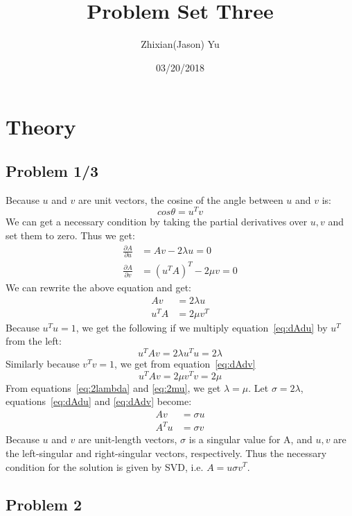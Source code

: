 \documentclass{article}
\title{Problem Set Three}
\date{03/20/2018}
\author{Zhixian(Jason) Yu}
\begin{document}
\maketitle
{}
\newpage

\section{Theory}
\subsection*{Problem 1/3}
Because $u$ and $v$ are unit vectors, the cosine of the angle between $u$ and $v$ is:
\begin{equation}
cos\theta = u^T v
\end{equation}
We can get a necessary condition by taking the partial derivatives over $u, v$ and set them to zero. Thus we get:
\begin{align}
\frac{\partial A}{\partial u} &= Av - 2\lambda u = 0 \\
\frac{\partial A}{\partial v} &= (u^TA)^T - 2\mu v = 0
\end{align}
We can rewrite the above equation and get:
\begin{align}
Av &= 2\lambda u  \label{eq:dAdu}\\
u^TA &= 2\mu v^T \label{eq:dAdv}
\end{align}
Because $u^Tu=1$, we get the following if we multiply equation~\ref{eq:dAdu} by $u^T$ from the left:
\begin{equation}
\label{eq:2lambda}
u^TAv = 2\lambda u^Tu = 2\lambda
\end{equation}
Similarly because $v^Tv=1$, we get from equation~\ref{eq:dAdv}
\begin{equation}
\label{eq:2mu}
u^TAv = 2\mu v^Tv = 2\mu
\end{equation}
From equations~\ref{eq:2lambda} and \ref{eq:2mu}, we get $\lambda=\mu$. Let $\sigma=2\lambda$, equations~\ref{eq:dAdu} and \ref{eq:dAdv} become:
\begin{align*}
Av &= \sigma u \\
A^T u &= \sigma v
\end{align*}
Because $u$ and $v$ are unit-length vectors, $\sigma$ is a singular value for A, and $u, v$ are the left-singular and right-singular vectors, respectively. Thus the necessary condition for the solution is given by SVD, i.e. $A=u\sigma v^T$.

\subsection*{Problem 2}
\end{document}
